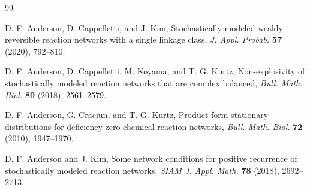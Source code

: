 \documentclass[11pt]{article}
\theoremstyle{definition}
\theoremstyle{remark}
\newcommand{\1}{\mathbf 1}
\begin{document}
\begin{thebibliography}{99}

D. F. Anderson, D. Cappelletti, and J. Kim,
\newblock Stochastically modeled weakly reversible reaction networks with a
single linkage class,
\newblock \emph{J. Appl. Probab.} \textbf{57} (2020), 792--810.

D. F. Anderson, D. Cappelletti, M. Koyama, and T. G. Kurtz,
\newblock Non-explosivity of stochastically modeled reaction networks that
are complex balanced,
\newblock \emph{Bull. Math. Biol.} \textbf{80} (2018), 2561--2579.

D. F. Anderson, G. Craciun, and T. G. Kurtz,
\newblock Product-form stationary distributions for deficiency zero chemical
reaction networks,
\newblock \emph{Bull. Math. Biol.} \textbf{72} (2010), 1947--1970.

D. F. Anderson and J. Kim,
\newblock Some network conditions for positive recurrence of stochastically
modeled reaction networks,
\newblock \emph{SIAM J. Appl. Math.} \textbf{78} (2018), 2692--2713.

\end{thebibliography}
\end{document}
